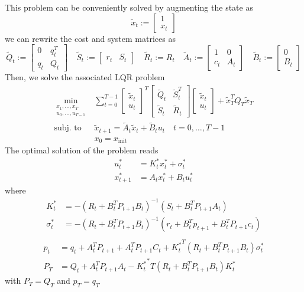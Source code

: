 \documentclass[openany]{book}
\theoremstyle{definition}
\theoremstyle{remark}
\begin{document}
This problem can be conveniently solved by augmenting the state as 
\[
    \tilde{x}_t := \begin{bmatrix}
        1 \\ x_t
    \end{bmatrix}
\]
we can rewrite the cost and system matrices as 
\[
    \tilde{Q}_t := \begin{bmatrix}
        0 & q_t^T \\ q_t  & Q_t
    \end{bmatrix} \quad \tilde{S}_t := \begin{bmatrix}
        r_t & S_t
    \end{bmatrix} \quad \tilde{R}_t := R_t \quad \tilde{A}_t := \begin{bmatrix}
        1 & 0 \\ c_t & A_t
    \end{bmatrix} \quad \tilde{B}_t := \begin{bmatrix}
        0 \\ B_t
    \end{bmatrix}
\]
Then, we solve the associated LQR problem 
\begin{align*}
    \min_{\substack{x_1,\dots,x_T\\u_0,\dots,u_{T-1}}} & \displaystyle\sum_{t=0}^{T-1}  \begin{bmatrix}
        \tilde{x}_t \\ u_t
    \end{bmatrix}^T \begin{bmatrix}
        \tilde{Q}_t & \tilde{S}_t^T \\ \tilde{S}_t & \tilde{R}_t
    \end{bmatrix} \begin{bmatrix}
        \tilde{x}_t \\ u_t
    \end{bmatrix} + \tilde{x}_T^TQ_T\tilde{x}_T\\ 
    \text{subj. to } & \tilde{x}_{t+1} = \tilde{A}_t\tilde{x}_t + \tilde{B}_tu_t  \quad t = 0,\dots,T-1 \\
    & x_0 = x_{\text{init}}
\end{align*}
The optimal solution of the problem reads 
\begin{align*}
    u_t^* &= K_t^*x_t^* + \sigma_t^*\\ 
    x_{t+1}^* &= A_tx_t^* + B_tu_t^*
\end{align*}
where 
\begin{align*}
    K_t^* &= -(R_t+B_t^TP_{t+1}B_t)^{-1}(S_t+B_t^TP_{t+1}A_t)\\ 
    \sigma_t^* &= -(R_t+B_t^TP_{t+1}B_t)^{-1}(r_t+B_t^Tp_{t+1}+B_t^TP_{t+1}c_t)\\
\end{align*}
\begin{align*}
    p_t &= q_t + A_t^TP_{t+1} + A_t^TP_{t+1}C_t + {K_t^*}^T(R_t+B_t^TP_{t+1}B_t)\sigma_t^*\\
    P_T &= Q_t + A_t^TP_{t+1}A_t - {K_t^*}^*T(R_t+B_t^TP_{t+1}B_t)K_t^*
\end{align*}
with $P_T = Q_T$ and $p_T = q_T$
\end{document}
